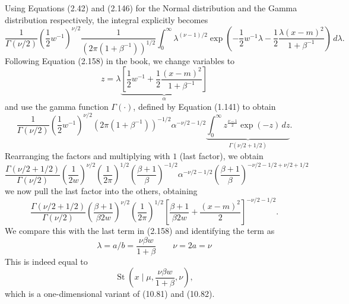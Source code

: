 \documentclass[12pt, a4paper]{article}
\begin{document}
Using Equations (2.42) and (2.146) for the Normal distribution and the Gamma distribution respectively, the integral explicitly becomes
\begin{equation}
\label{eqn:ch10_prob19_b}
\frac{1}{\Gamma(\nu/2)}
\left( \frac{1}{2} w^{-1} \right)^{\nu / 2}
\frac{1}{(2 \pi (1 + \beta^{-1}))^{1/2}}
\int_0^{\infty}
\lambda^{(\nu - 1)/2}
\exp\left( - \frac{1}{2} w^{-1} \lambda 
- \frac{1}{2} \frac{\lambda(x - m)^2 }{1 + \beta^{-1}}
\right)
\, d \lambda.
\end{equation}
Following Equation (2.158) in the book, we change variables to
\begin{equation*}
	z = \lambda \underbrace{\left[  \frac{1}{2} w^{-1} +  \frac{1}{2} \frac{(x - m)^2 }{1 + \beta^{-1}} \right]}_{\alpha} 
\end{equation*}
and use the gamma function $\Gamma(\cdot)$, defined by Equation (1.141) to obtain
\begin{equation*}
	\frac{1}{\Gamma (\nu/2)}
	\left( \frac{1}{2} w^{-1} \right)^{\nu / 2}
	(2 \pi (1 + \beta^{-1}))^{-1/2}
	\alpha^{- \nu / 2 - 1/2}
	\underbrace{\int_0^{\infty} z ^{\frac{\nu - 1}{2}} \exp(-z) \, d z}_{\Gamma(\nu / 2 + 1/2)}.
\end{equation*}
Rearranging the factors and multiplying with $1$ (last factor), we obtain
\begin{equation*}
\frac{\Gamma(\nu / 2 + 1/2)}{\Gamma (\nu/2)}
\left(\frac{1}{2 w}\right)^{\nu / 2}
\left(\frac{1}{2 \pi}\right)^{1 / 2}
\left(\frac{\beta + 1}{\beta}\right)^{-1/2}
\alpha^{- \nu / 2 - 1/2}
\left(\frac{\beta + 1}{\beta}\right)^{-\nu/2 - 1/2 + \nu/2 + 1/2}
\end{equation*}
we now pull the last factor into the others, obtaining
\begin{equation*}
\frac{\Gamma(\nu / 2 + 1/2)}{\Gamma (\nu/2)}
\left(\frac{\beta + 1}{\beta 2 w}\right)^{\nu / 2}
\left(\frac{1}{2 \pi}\right)^{1 / 2}
\left[  \frac{\beta + 1}{\beta 2 w} +  \frac{(x - m)^2}{2} \right]^{- \nu / 2 - 1/2}.
\end{equation*}
We compare this with the last term in (2.158) and identifying the term as
\begin{equation*}
	\lambda = a / b = \frac{\nu \beta w}{1 + \beta}
	\qquad
	\nu =  2a = \nu
\end{equation*}
This is indeed equal to
\begin{equation*}
	\operatorname{St}(x \mid \mu, \frac{\nu \beta w}{1 + \beta}, \nu ),
\end{equation*}
which is a one-dimensional variant of (10.81) and (10.82).
\end{document}
